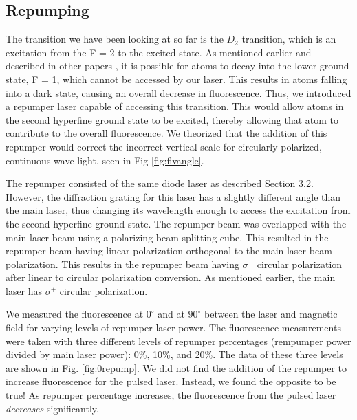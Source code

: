 \subsection{Repumping}
The transition we have been looking at so far is the $D_{2}$ transition, which is an excitation from the F = 2 to the excited state. As mentioned earlier and described in other papers \cite{Kane2014}, it is possible for atoms to decay into the lower ground state, F = 1, which cannot be accessed by our laser. This results in atoms falling into a dark state, causing an overall decrease in fluorescence. Thus, we introduced a repumper laser capable of accessing this transition. This would allow atoms in the second hyperfine ground state to be excited, thereby allowing that atom to contribute to the overall fluorescence. We theorized that the addition of this repumper would correct the incorrect vertical scale for circularly polarized, continuous wave light, seen in Fig \ref{fig:flvangle}. 

The repumper consisted of the same diode laser as described Section 3.2. However, the diffraction grating for this laser has a slightly different angle than the main laser, thus changing its wavelength enough to access the excitation from the second hyperfine ground state. The repumper beam was overlapped with the main laser beam using a polarizing beam splitting cube. This resulted in the repumper beam having linear polarization orthogonal to the main laser beam polarization. This results in the repumper beam having $\sigma^{-}$ circular polarization after linear to circular polarization conversion. As mentioned earlier, the main laser has $\sigma^{+}$ circular polarization.

We measured the fluorescence at $0^{\circ}$ and at $90^{\circ}$ between the laser and magnetic field for varying levels of repumper laser power. The fluorescence measurements were taken with three different levels of repumper percentages (rempumper power divided by main laser power): 0\%, 10\%, and 20\%. The data of these three levels are shown in Fig. \ref{fig:0repump}. We did not find the addition of the repumper to increase fluorescence for the pulsed laser. Instead, we found the opposite to be true! As repumper percentage increases, the fluorescence from the pulsed laser \textit{decreases} significantly.

